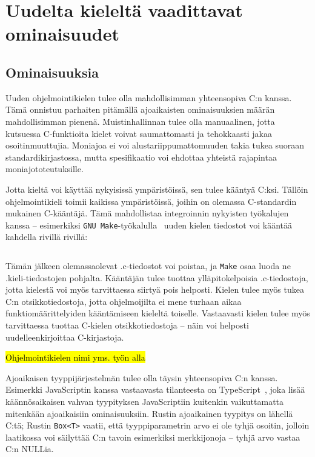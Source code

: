 \section{Uudelta kieleltä vaadittavat ominaisuudet}

\subsection{Ominaisuuksia}

Uuden ohjelmointikielen tulee olla mahdollisimman yhteensopiva C:n kanssa. Tämä
onnistuu parhaiten pitämällä ajoaikaisten ominaisuuksien määrän mahdollisimman
pienenä. Muistinhallinnan tulee olla manuaalinen, jotta kutsuessa C-funktioita
kielet voivat saumattomasti ja tehokkaasti jakaa osoitinmuuttujia. Moniajoa ei
voi alustariippumattomuuden takia tukea suoraan standardikirjastossa, mutta
spesifikaatio voi ehdottaa yhteistä rajapintaa moniajototeutuksille.

Jotta kieltä voi käyttää nykyisissä ympäristöissä, sen tulee kääntyä C:ksi.
Tällöin ohjelmointikieli toimii kaikissa ympäristöissä, joihin on olemassa
C-standardin mukainen C-kääntäjä. Tämä mahdollistaa integroinnin nykyisten
työkalujen kanssa -- esimerkiksi \texttt{GNU Make}-työkalulla~\citep{gnumake}
uuden kielen tiedostot voi kääntää kahdella rivillä rivillä:

\inputminted{make}{Makefile.kieli}

Tämän jälkeen olemassaolevat .c-tiedostot voi poistaa, ja \texttt{Make} osaa
luoda ne .kieli-tiedostojen pohjalta. Kääntäjän tulee tuottaa ylläpitokelpoisia
.c-tiedostoja, jotta kielestä voi myös tarvittaessa siirtyä pois helposti.
Kielen tulee myös tukea C:n otsikkotiedostoja, jotta ohjelmoijilta ei mene
turhaan aikaa funktiomäärittelyiden kääntämiseen kieleltä toiselle. Vastaavasti
kielen tulee myös tarvittaessa tuottaa C-kielen otsikkotiedostoja -- näin voi
helposti uudelleenkirjoittaa C-kirjastoja.

\hl{Ohjelmointikielen nimi yms. työn alla}

Ajoaikaisen tyyppijärjestelmän tulee olla täysin yhteensopiva C:n kanssa.
Esimerkki JavaScriptin kanssa vastaavasta tilanteesta on
TypeScript~\citep{typescript}, joka lisää käännösaikaisen vahvan tyypityksen
JavaScriptiin kuitenkin vaikuttamatta mitenkään ajoaikaisiin ominaisuuksiin.
Rustin ajoaikainen tyypitys on lähellä C:tä; Rustin \texttt{Box<T>} vaatii,
että tyyppiparametrin arvo ei ole tyhjä osoitin, jolloin laatikossa voi säilyttää C:n tavoin
esimerkiksi merkkijonoja -- tyhjä arvo vastaa C:n NULLia.

